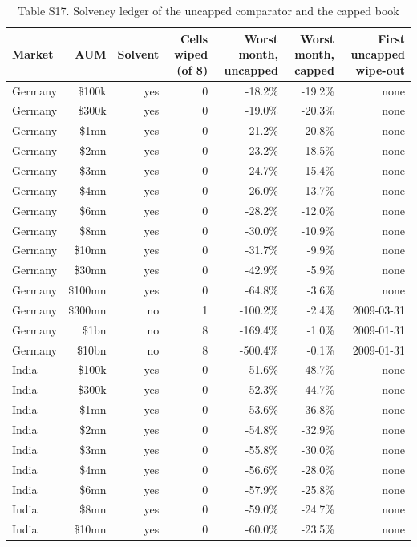 \begin{table}[t]
\centering
\small
\caption{Table S17. Solvency ledger of the uncapped comparator and the capped book}
\label{tab:s17}
\begin{tabular}{lrrrrrr}
\toprule
Market & AUM & Solvent & Cells wiped (of 8) & Worst month, uncapped & Worst month, capped & First uncapped wipe-out \\
\midrule
Germany & \$100k & yes & 0 & -18.2\% & -19.2\% & none \\
Germany & \$300k & yes & 0 & -19.0\% & -20.3\% & none \\
Germany & \$1mn & yes & 0 & -21.2\% & -20.8\% & none \\
Germany & \$2mn & yes & 0 & -23.2\% & -18.5\% & none \\
Germany & \$3mn & yes & 0 & -24.7\% & -15.4\% & none \\
Germany & \$4mn & yes & 0 & -26.0\% & -13.7\% & none \\
Germany & \$6mn & yes & 0 & -28.2\% & -12.0\% & none \\
Germany & \$8mn & yes & 0 & -30.0\% & -10.9\% & none \\
Germany & \$10mn & yes & 0 & -31.7\% & -9.9\% & none \\
Germany & \$30mn & yes & 0 & -42.9\% & -5.9\% & none \\
Germany & \$100mn & yes & 0 & -64.8\% & -3.6\% & none \\
Germany & \$300mn & no & 1 & -100.2\% & -2.4\% & 2009-03-31 \\
Germany & \$1bn & no & 8 & -169.4\% & -1.0\% & 2009-01-31 \\
Germany & \$10bn & no & 8 & -500.4\% & -0.1\% & 2009-01-31 \\
India & \$100k & yes & 0 & -51.6\% & -48.7\% & none \\
India & \$300k & yes & 0 & -52.3\% & -44.7\% & none \\
India & \$1mn & yes & 0 & -53.6\% & -36.8\% & none \\
India & \$2mn & yes & 0 & -54.8\% & -32.9\% & none \\
India & \$3mn & yes & 0 & -55.8\% & -30.0\% & none \\
India & \$4mn & yes & 0 & -56.6\% & -28.0\% & none \\
India & \$6mn & yes & 0 & -57.9\% & -25.8\% & none \\
India & \$8mn & yes & 0 & -59.0\% & -24.7\% & none \\
India & \$10mn & yes & 0 & -60.0\% & -23.5\% & none \\

\end{tabular}
\end{table}
